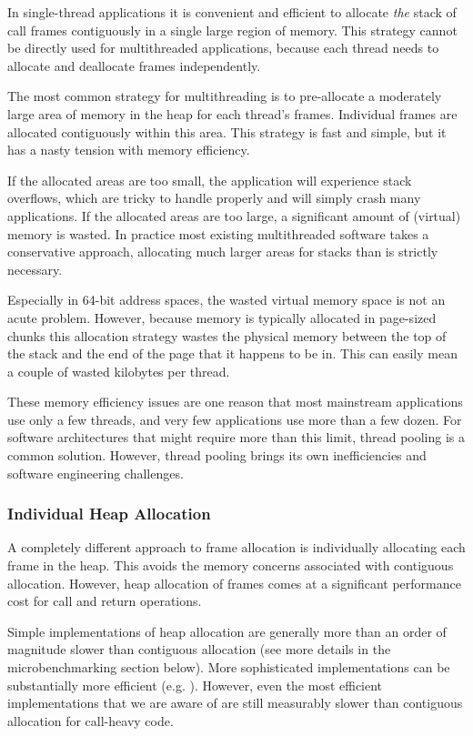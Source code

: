 \documentclass[10pt,preprint]{sigplanconf}
\begin{document}
In single-thread applications it is convenient and efficient to allocate \emph{the} stack of call frames contiguously in a single large region of memory.
This strategy cannot be directly used for multithreaded applications, because each thread needs to allocate and deallocate frames independently.

The most common strategy for multithreading is to pre-allocate a moderately large area of memory in the heap for each thread's frames.
Individual frames are allocated contiguously within this area.
This strategy is fast and simple, but it has a nasty tension with memory efficiency.

If the allocated areas are too small, the application will experience stack overflows, which are tricky to handle properly and will simply crash many applications.
If the allocated areas are too large, a significant amount of (virtual) memory is wasted.
In practice most existing multithreaded software takes a conservative approach, allocating much larger areas for stacks than is strictly necessary.

Especially in 64-bit address spaces, the wasted virtual memory space is not an acute problem.
However, because memory is typically allocated in page-sized chunks this allocation strategy wastes the physical memory between the top of the stack and the end of the page that it happens to be in.
This can easily mean a couple of wasted kilobytes per thread.

These memory efficiency issues are one reason that most mainstream applications use only a few threads, and very few applications use more than a few dozen.
For software architectures that might require more than this limit, thread pooling is a common solution.
However, thread pooling brings its own inefficiencies and software engineering challenges.

\subsubsection{Individual Heap Allocation}

A completely different approach to frame allocation is individually allocating each frame in the heap.
This avoids the memory concerns associated with contiguous allocation.
However, heap allocation of frames comes at a significant performance cost for call and return operations.

Simple implementations of heap allocation are generally more than an order of magnitude slower than contiguous allocation (see more details in the microbenchmarking section below).
More sophisticated implementations can be substantially more efficient (e.g. \cite{Shao2000}).
However, even the most efficient implementations that we are aware of are still measurably slower than contiguous allocation for call-heavy code.
\end{document}
